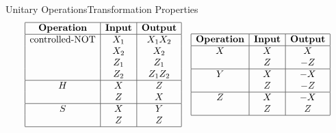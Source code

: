 \begin{frame}{Unitary Operations}{Transformation Properties}
    \[
        \renewcommand{\arraystretch}{1.0}
        \begin{array}{|c|c|c|}
            \hline
            \textbf{Operation}    & \textbf{Input} & \textbf{Output} \\
            \hline
            \text{controlled-NOT} & X_1            & X_1 X_2         \\
            & X_2            & X_2             \\
            & Z_1            & Z_1             \\
            & Z_2            & Z_1 Z_2         \\
            \hline
            H                     & X              & Z               \\
            & Z              & X               \\
            \hline
            S                     & X              & Y               \\
            & Z              & Z               \\
            \hline
        \end{array}
        \quad
        \begin{array}{|c|c|c|}
            \hline
            \textbf{Operation} & \textbf{Input} & \textbf{Output} \\
            \hline
            X                  & X              & X               \\
            & Z              & -Z              \\
            \hline
            Y                  & X              & -X              \\
            & Z              & -Z              \\
            \hline
            Z                  & X              & -X              \\
            & Z              & Z               \\
            \hline
        \end{array}
    \]

    \vspace*{10mm}

\end{frame}